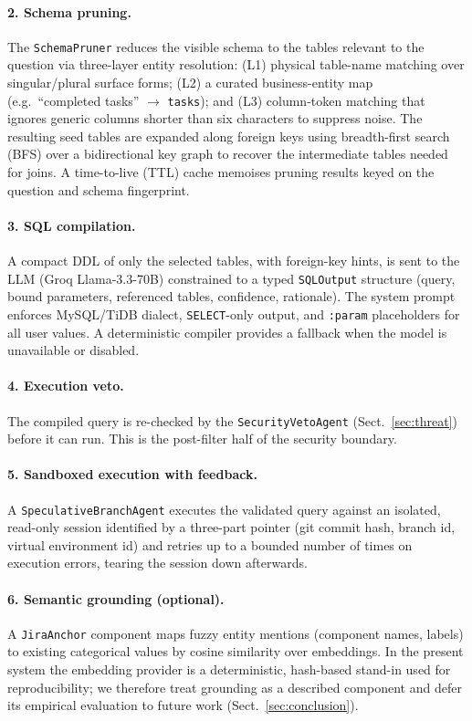 \documentclass[runningheads]{llncs}
\begin{document}
\paragraph{2. Schema pruning.} The \texttt{SchemaPruner} reduces the visible schema to the tables relevant to the question via three-layer entity resolution: (L1) physical table-name matching over singular/plural surface forms; (L2) a curated business-entity map (e.g.\ ``completed tasks'' $\rightarrow$ \texttt{tasks}); and (L3) column-token matching that ignores generic columns shorter than six characters to suppress noise. The resulting seed tables are expanded along foreign keys using breadth-first search (BFS) over a bidirectional key graph to recover the intermediate tables needed for joins. A time-to-live (TTL) cache memoises pruning results keyed on the question and schema fingerprint.

\paragraph{3. SQL compilation.} A compact DDL of only the selected tables, with foreign-key hints, is sent to the LLM (Groq Llama-3.3-70B) constrained to a typed \texttt{SQLOutput} structure (query, bound parameters, referenced tables, confidence, rationale). The system prompt enforces MySQL/TiDB dialect, \texttt{SELECT}-only output, and \texttt{:param} placeholders for all user values. A deterministic compiler provides a fallback when the model is unavailable or disabled.

\paragraph{4. Execution veto.} The compiled query is re-checked by the \texttt{SecurityVetoAgent} (Sect.~\ref{sec:threat}) before it can run. This is the post-filter half of the security boundary.

\paragraph{5. Sandboxed execution with feedback.} A \texttt{SpeculativeBranchAgent} executes the validated query against an isolated, read-only session identified by a three-part pointer (git commit hash, branch id, virtual environment id) and retries up to a bounded number of times on execution errors, tearing the session down afterwards.

\paragraph{6. Semantic grounding (optional).} A \texttt{JiraAnchor} component maps fuzzy entity mentions (component names, labels) to existing categorical values by cosine similarity over embeddings. In the present system the embedding provider is a deterministic, hash-based stand-in used for reproducibility; we therefore treat grounding as a described component and defer its empirical evaluation to future work (Sect.~\ref{sec:conclusion}).
\end{document}
